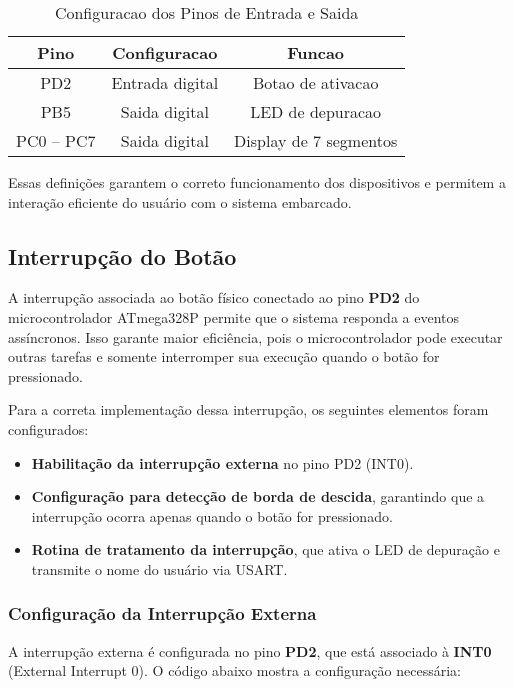 \documentclass{sbrt}
\begin{document}
\begin{table}[h]
\centering
\caption{Configuracao dos Pinos de Entrada e Saida}
\label{tab:pinos}
\begin{tabular}{|c|c|c|}
\hline
\textbf{Pino} & \textbf{Configuracao} & \textbf{Funcao} \\
\hline
PD2 & Entrada digital & Botao de ativacao \\
PB5 & Saida digital & LED de depuracao \\
PC0 -- PC7 & Saida digital & Display de 7 segmentos \\
\hline
\end{tabular}
\end{table}

Essas definições garantem o correto funcionamento dos dispositivos e permitem a interação eficiente do usuário com o sistema embarcado.

\subsection{Interrupção do Botão}

A interrupção associada ao botão físico conectado ao pino \textbf{PD2} do microcontrolador ATmega328P permite que o sistema responda a eventos assíncronos. Isso garante maior eficiência, pois o microcontrolador pode executar outras tarefas e somente interromper sua execução quando o botão for pressionado. 

Para a correta implementação dessa interrupção, os seguintes elementos foram configurados:
\begin{itemize}
    \item \textbf{Habilitação da interrupção externa} no pino PD2 (INT0).
    \item \textbf{Configuração para detecção de borda de descida}, garantindo que a interrupção ocorra apenas quando o botão for pressionado.
    \item \textbf{Rotina de tratamento da interrupção}, que ativa o LED de depuração e transmite o nome do usuário via USART.
\end{itemize}

\subsubsection{Configuração da Interrupção Externa}
A interrupção externa é configurada no pino \textbf{PD2}, que está associado à \textbf{INT0} (External Interrupt 0). O código abaixo mostra a configuração necessária:
\end{document}

